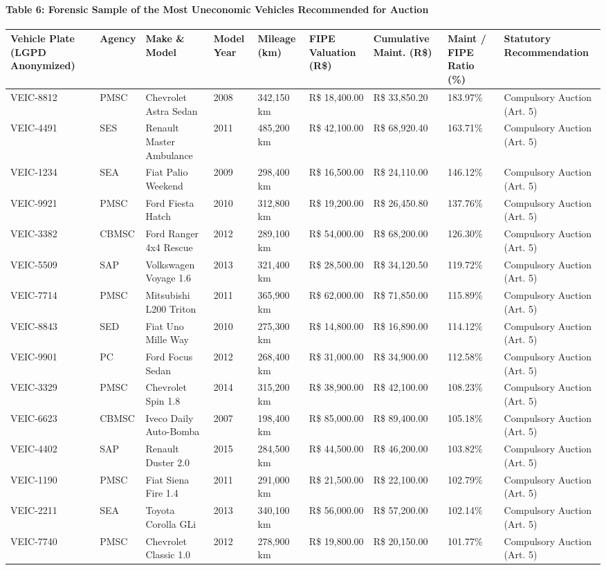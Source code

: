 \documentclass[10pt,a4paper,journal]{article}
\begin{document}
\paragraph{Table 6: Forensic Sample of the Most Uneconomic Vehicles Recommended for Auction}
\begin{table}[htbp]
\centering
\small
\begin{tabular}{lllllllll}
\toprule
Vehicle Plate (LGPD Anonymized) & Agency & Make \& Model & Model Year & Mileage (km) & FIPE Valuation (R\$) & Cumulative Maint. (R\$) & Maint / FIPE Ratio (\%) & Statutory Recommendation \\
\midrule
VEIC-8812 & PMSC & Chevrolet Astra Sedan & 2008 & 342,150 km & R\$ 18,400.00 & R\$ 33,850.20 & 183.97\% & Compulsory Auction (Art. 5) \\
VEIC-4491 & SES & Renault Master Ambulance & 2011 & 485,200 km & R\$ 42,100.00 & R\$ 68,920.40 & 163.71\% & Compulsory Auction (Art. 5) \\
VEIC-1234 & SEA & Fiat Palio Weekend & 2009 & 298,400 km & R\$ 16,500.00 & R\$ 24,110.00 & 146.12\% & Compulsory Auction (Art. 5) \\
VEIC-9921 & PMSC & Ford Fiesta Hatch & 2010 & 312,800 km & R\$ 19,200.00 & R\$ 26,450.80 & 137.76\% & Compulsory Auction (Art. 5) \\
VEIC-3382 & CBMSC & Ford Ranger 4x4 Rescue & 2012 & 289,100 km & R\$ 54,000.00 & R\$ 68,200.00 & 126.30\% & Compulsory Auction (Art. 5) \\
VEIC-5509 & SAP & Volkswagen Voyage 1.6 & 2013 & 321,400 km & R\$ 28,500.00 & R\$ 34,120.50 & 119.72\% & Compulsory Auction (Art. 5) \\
VEIC-7714 & PMSC & Mitsubishi L200 Triton & 2011 & 365,900 km & R\$ 62,000.00 & R\$ 71,850.00 & 115.89\% & Compulsory Auction (Art. 5) \\
VEIC-8843 & SED & Fiat Uno Mille Way & 2010 & 275,300 km & R\$ 14,800.00 & R\$ 16,890.00 & 114.12\% & Compulsory Auction (Art. 5) \\
VEIC-9901 & PC & Ford Focus Sedan & 2012 & 268,400 km & R\$ 31,000.00 & R\$ 34,900.00 & 112.58\% & Compulsory Auction (Art. 5) \\
VEIC-3329 & PMSC & Chevrolet Spin 1.8 & 2014 & 315,200 km & R\$ 38,900.00 & R\$ 42,100.00 & 108.23\% & Compulsory Auction (Art. 5) \\
VEIC-6623 & CBMSC & Iveco Daily Auto-Bomba & 2007 & 198,400 km & R\$ 85,000.00 & R\$ 89,400.00 & 105.18\% & Compulsory Auction (Art. 5) \\
VEIC-4402 & SAP & Renault Duster 2.0 & 2015 & 284,500 km & R\$ 44,500.00 & R\$ 46,200.00 & 103.82\% & Compulsory Auction (Art. 5) \\
VEIC-1190 & PMSC & Fiat Siena Fire 1.4 & 2011 & 291,000 km & R\$ 21,500.00 & R\$ 22,100.00 & 102.79\% & Compulsory Auction (Art. 5) \\
VEIC-2211 & SEA & Toyota Corolla GLi & 2013 & 340,100 km & R\$ 56,000.00 & R\$ 57,200.00 & 102.14\% & Compulsory Auction (Art. 5) \\
VEIC-7740 & PMSC & Chevrolet Classic 1.0 & 2012 & 278,900 km & R\$ 19,800.00 & R\$ 20,150.00 & 101.77\% & Compulsory Auction (Art. 5) \\
\bottomrule
\end{tabular}
\end{table}
\end{document}
